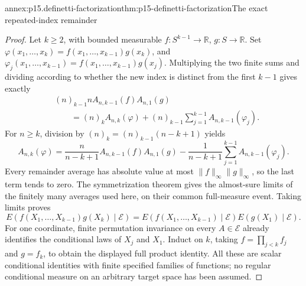 \begin{annexitem}{annex:p15.definetti-factorization}{thm:p15-definetti-factorization}{The exact repeated-index remainder}
\begin{proof}
Let \(k\geq2\), with bounded measurable
\(f:S^{k-1}\to\mathbb R\), \(g:S\to\mathbb R\).
Set \(\varphi(x_1,\ldots,x_k)=f(x_1,\ldots,x_{k-1})g(x_k)\),
and \(\varphi_j(x_1,\ldots,x_{k-1})=f(x_1,\ldots,x_{k-1})g(x_j)\).
Multiplying the two finite sums and dividing according to whether the
new index is distinct from the first \(k-1\) gives exactly
\[
 \begin{aligned}
 &(n)_{k-1}n A_{n,k-1}(f)A_{n,1}(g)\\
 &\qquad=(n)_k A_{n,k}(\varphi)
                +(n)_{k-1}\sum_{j=1}^{k-1}A_{n,k-1}(\varphi_j).
 \end{aligned}
\]
For \(n\geq k\), division by \((n)_k=(n)_{k-1}(n-k+1)\) yields
\[
 A_{n,k}(\varphi)
   =\frac{n}{n-k+1}A_{n,k-1}(f)A_{n,1}(g)
       -\frac1{n-k+1}\sum_{j=1}^{k-1}A_{n,k-1}(\varphi_j).
\]
Every remainder average has absolute value at most
\(\|f\|_\infty\|g\|_\infty\), so the last term tends to zero.
The symmetrization theorem gives the almost-sure limits of the
finitely many averages used here, on their common full-measure event.
Taking limits proves
\[
 E(f(X_1,\ldots,X_{k-1})g(X_k)\mid\mathcal E)
   =E(f(X_1,\ldots,X_{k-1})\mid\mathcal E)
                    E(g(X_1)\mid\mathcal E).
\]
For one coordinate, finite permutation invariance on every
\(A\in\mathcal E\) already identifies the conditional laws of \(X_j\)
and \(X_1\). Induct on \(k\), taking \(f=\prod_{j<k}f_j\) and \(g=f_k\),
to obtain the displayed full product identity.
All these are scalar conditional identities with finite specified
families of functions; no regular conditional measure on an arbitrary
target space has been assumed.
\end{proof}
\end{annexitem}


